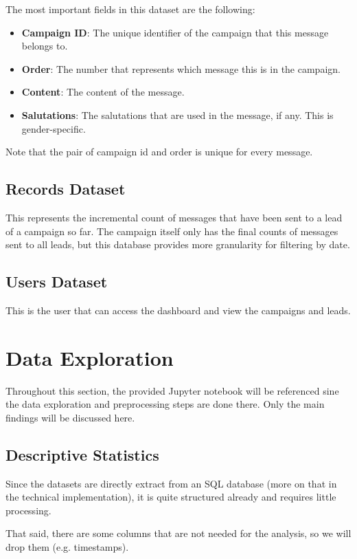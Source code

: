 The most important fields in this dataset are the following:
\begin{itemize}
    \item \textbf{Campaign ID}: The unique identifier of the campaign that this message belongs to.
    \item \textbf{Order}: The number that represents which message this is in the campaign.
    \item \textbf{Content}: The content of the message.
    \item \textbf{Salutations}: The salutations that are used in the message, if any. This is gender-specific.
\end{itemize}

Note that the pair of campaign id and order is unique for every message.

\subsection{Records Dataset}
This represents the incremental count of messages that have been sent to a lead of a campaign so far.
The campaign itself only has the final counts of messages sent to all leads, but this database provides more granularity for filtering by date.

\subsection{Users Dataset}
This is the user that can access the dashboard and view the campaigns and leads.

\section{Data Exploration}

Throughout this section, the provided Jupyter notebook will be referenced sine the data exploration and preprocessing steps are done there.
Only the main findings will be discussed here.

\subsection{Descriptive Statistics}
Since the datasets are directly extract from an SQL database (more on that in the technical implementation), it is quite structured already and requires little processing.

That said, there are some columns that are not needed for the analysis, so we will drop them (e.g. timestamps).

